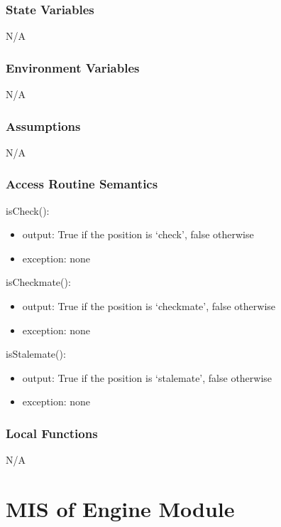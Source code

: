 \documentclass[12pt, titlepage]{article}
\begin{document}
    \subsubsection{State Variables}
    N/A

    \subsubsection{Environment Variables}
    N/A

    \subsubsection{Assumptions}
    N/A

    \subsubsection{Access Routine Semantics}
        \noindent isCheck():
        \begin{itemize}
            \item output: True if the position is `check', false otherwise
            \item exception: none
        \end{itemize}

        \noindent isCheckmate():
        \begin{itemize}
            \item output: True if the position is `checkmate', false otherwise
            \item exception: none
        \end{itemize}

        \noindent isStalemate():
        \begin{itemize}
            \item output: True if the position is `stalemate', false otherwise
            \item exception: none
        \end{itemize}

    \subsubsection{Local Functions}
    N/A

\newpage

\section{MIS of Engine Module} \label{mEngine}
\end{document}
